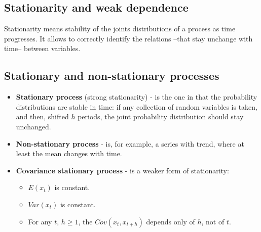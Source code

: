 \documentclass[10pt, a4paper, landscape]{extarticle}
\begin{document}
\begin{multicols}{3}
\section*{Stationarity and weak dependence}
	Stationarity means stability of the joints distributions of a process as time progresses. It allows to correctly identify the relations --that stay unchange with time-- between variables.
	\subsection*{Stationary and non-stationary processes}
		\begin{itemize}[leftmargin=*]
			\item \textbf{Stationary process} (strong stationarity) - is the one in that the probability distributions are stable in time: if any collection of random variables is taken, and then, shifted $h$ periods, the joint probability distribution should stay unchanged.
\columnbreak
			\item \textbf{Non-stationary process} - is, for example, a series with trend, where at least the mean changes with time.
			\item \textbf{Covariance stationary process} - is a weaker form of stationarity:
			\begin{itemize}[leftmargin=*]
				\item $E(x_t)$ is constant.
				\item $Var(x_t)$ is constant.
				\item For any $t$,  $h \geq 1$, the $Cov(x_t, x_{t+h})$ depends only of $h$, not of $t$.
			\end{itemize}
		\end{itemize}

\end{multicols}
\end{document}

